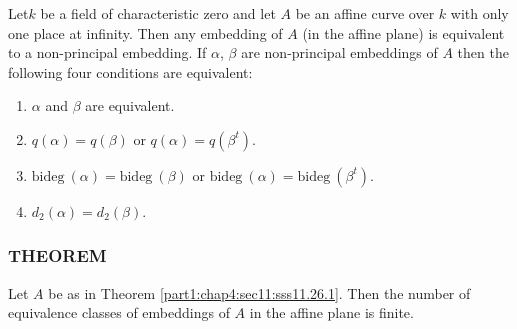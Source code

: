 Let\pageoriginale $k$ be a field of characteristic zero and let $A$ be
an affine curve over $k$ with only one place at infinity. Then any
embedding of $A$ (in the affine plane) is equivalent to a
non-principal embedding. If $\alpha$, $\beta$ are non-principal
embeddings of $A$ then the following four conditions are equivalent:
\begin{enumerate}[(1)]
\item $\alpha$ and $\beta$ are equivalent.
\item $q (\alpha)= q (\beta)$ or $q(\alpha)= q(\beta^t)$.
\item $\text{bideg}~(\alpha)= \text{bideg}~(\beta)$ or
  $\text{bideg}~(\alpha)= \text{bideg}~(\beta^t)$. 
\item $d_2 (\alpha)= d_2 (\beta)$.
\end{enumerate}

\subsubsection{THEOREM}\label{part1:chap4:sec11:sss11.26.2}

Let $A$ be as in Theorem \ref{part1:chap4:sec11:sss11.26.1}. Then the
number of equivalence classes of embeddings of $A$ in the affine plane
is finite.


